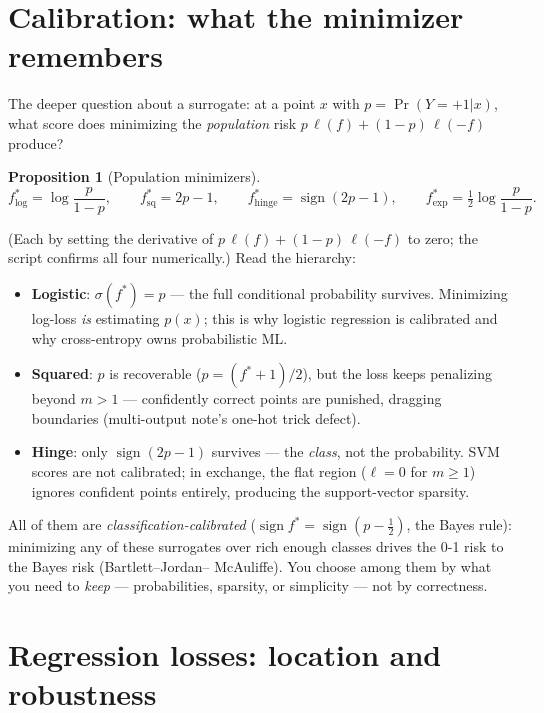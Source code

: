\documentclass[11pt]{article}
\newtheorem{proposition}{Proposition}
\begin{document}
\section{Calibration: what the minimizer remembers}

The deeper question about a surrogate: at a point $x$ with
$p = \Pr(Y{=}+1|x)$, what score does minimizing the \emph{population}
risk $p\,\ell(f) + (1-p)\,\ell(-f)$ produce?

\begin{proposition}[Population minimizers]
\begin{equation}
  f^\ast_{\mathrm{log}} = \log\frac{p}{1-p},
  \qquad
  f^\ast_{\mathrm{sq}} = 2p - 1,
  \qquad
  f^\ast_{\mathrm{hinge}} = \operatorname{sign}(2p - 1),
  \qquad
  f^\ast_{\exp} = \tfrac12\log\frac{p}{1-p}.
  \label{eq:calibration}
\end{equation}
\end{proposition}
(Each by setting the derivative of $p\,\ell(f) + (1-p)\,\ell(-f)$ to
zero; the script confirms all four numerically.) Read the hierarchy:
\begin{itemize}
  \item \textbf{Logistic}: $\sigma(f^\ast) = p$ --- the full conditional
    probability survives. Minimizing log-loss \emph{is} estimating
    $p(x)$; this is why logistic regression is calibrated and why
    cross-entropy owns probabilistic ML.
  \item \textbf{Squared}: $p$ is recoverable ($p = (f^\ast+1)/2$), but
    the loss keeps penalizing beyond $m > 1$ --- confidently correct
    points are punished, dragging boundaries (multi-output note's
    one-hot trick defect).
  \item \textbf{Hinge}: only $\operatorname{sign}(2p-1)$ survives ---
    the \emph{class}, not the probability. SVM scores are not
    calibrated; in exchange, the flat region ($\ell = 0$ for $m \ge 1$)
    ignores confident points entirely, producing the support-vector
    sparsity.
\end{itemize}
All of them are \emph{classification-calibrated}
($\operatorname{sign} f^\ast = \operatorname{sign}(p - \tfrac12)$, the
Bayes rule): minimizing any of these surrogates over rich enough
classes drives the 0-1 risk to the Bayes risk (Bartlett--Jordan--
McAuliffe). You choose among them by what you need to
\emph{keep} --- probabilities, sparsity, or simplicity --- not by
correctness.

\section{Regression losses: location and robustness}
\end{document}
